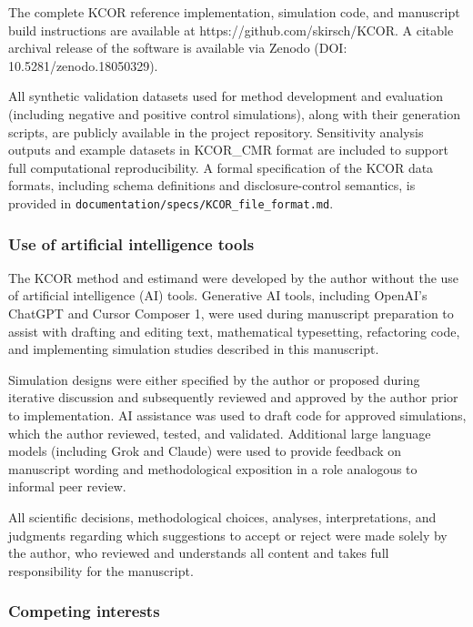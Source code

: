 \documentclass[
]{article}
\begin{document}
The complete KCOR reference implementation, simulation code, and manuscript build instructions are available at https://github.com/skirsch/KCOR. A citable archival release of the software is available via Zenodo (DOI: 10.5281/zenodo.18050329).

All synthetic validation datasets used for method development and evaluation (including negative and positive control simulations), along with their generation scripts, are publicly available in the project repository. Sensitivity analysis outputs and example datasets in KCOR\_CMR format are included to support full computational reproducibility. A formal specification of the KCOR data formats, including schema definitions and disclosure-control semantics, is provided in \texttt{documentation/specs/KCOR\_file\_format.md}.

\subsubsection{Use of artificial intelligence tools}\label{use-of-artificial-intelligence-tools}

The KCOR method and estimand were developed by the author without the use of artificial intelligence (AI) tools. Generative AI tools, including OpenAI's ChatGPT and Cursor Composer 1, were used during manuscript preparation to assist with drafting and editing text, mathematical typesetting, refactoring code, and implementing simulation studies described in this manuscript.

Simulation designs were either specified by the author or proposed during iterative discussion and subsequently reviewed and approved by the author prior to implementation. AI assistance was used to draft code for approved simulations, which the author reviewed, tested, and validated. Additional large language models (including Grok and Claude) were used to provide feedback on manuscript wording and methodological exposition in a role analogous to informal peer review.

All scientific decisions, methodological choices, analyses, interpretations, and judgments regarding which suggestions to accept or reject were made solely by the author, who reviewed and understands all content and takes full responsibility for the manuscript.

\subsubsection{Competing interests}\label{competing-interests}
\end{document}
